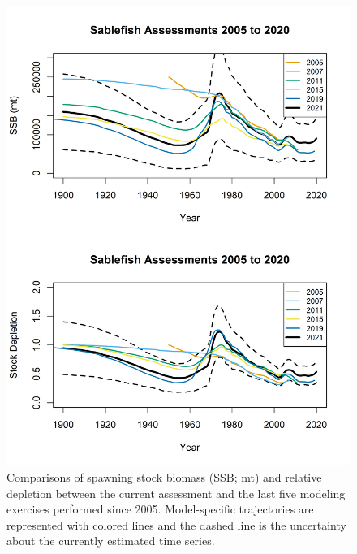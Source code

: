 \documentclass[11pt,
  english,
  a4paper,
]{article}
\begin{document}
\tagmcend\tagstructend


\begin{figure}
\centering
\includegraphics[width=1\textwidth,height=0.75\textheight]{figs/HistoricalModelCompare.png}
\caption{Comparisons of spawning stock biomass (SSB; mt) and relative depletion between the current assessment and the last five modeling exercises performed since 2005. Model-specific trajectories are represented with colored lines and the dashed line is the uncertainty about the currently estimated time series.\label{fig:histassess}}
\end{figure}

\tagmcend\tagstructend

\end{document}
